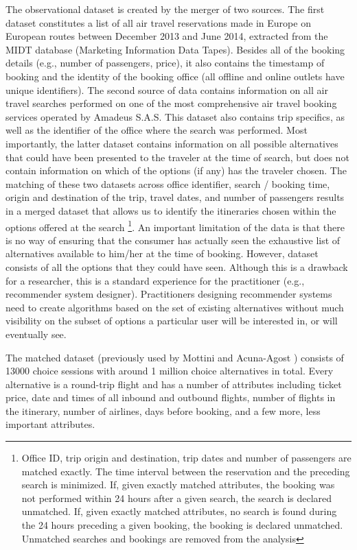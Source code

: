 \documentclass[a4paper,12pt]{article}
\newcommand{\citeyearonly}[1]{\citeyearpar{#1}}
\begin{document}
The observational dataset is created by the merger of two sources. The first dataset constitutes a list of all air travel reservations made in Europe on European routes between December 2013 and June 2014, extracted from the MIDT database (Marketing Information Data Tapes). Besides all of the booking details (e.g., number of passengers, price), it also contains the timestamp of booking and the identity of the booking office (all offline and online outlets have unique identifiers). The second source of data contains information on all air travel searches performed on one of the most comprehensive air travel booking services operated by Amadeus S.A.S. This dataset also contains trip specifics, as well as the identifier of the office where the search was performed. Most importantly, the latter dataset contains information on all possible alternatives that could have been presented to the traveler at the time of search, but does not contain information on which of the options (if any) has the traveler chosen. The matching of these two datasets across office identifier, search / booking time, origin and destination of the trip, travel dates, and number of passengers results in a merged dataset that allows us to identify the itineraries chosen within the options offered at the search \footnote{Office ID, trip origin and destination, trip dates and number of passengers are matched exactly. The time interval between the reservation and the preceding search is minimized. If, given exactly matched attributes, the booking was not performed within 24 hours after a given search, the search is declared unmatched. If, given exactly matched attributes, no search is found during the 24 hours preceding a given booking, the booking is declared unmatched. Unmatched searches and bookings are removed from the analysis}.  An important limitation of the data is that there is no way of ensuring that the consumer has actually seen the exhaustive list of alternatives available to him/her at the time of booking. However, dataset consists of all the options that they could have seen. Although this is a drawback for a researcher, this is a standard experience for the practitioner (e.g., recommender system designer). Practitioners designing recommender systems need to create algorithms based on the set of existing alternatives without much visibility on the subset of options a particular user will be interested in, or will eventually see.

The matched dataset (previously used by Mottini and Acuna-Agost \citeyearonly{mottiniAcunaAgost17}) consists of 13000 choice sessions with around 1 million choice alternatives in total. Every alternative is a round-trip flight and has a number of attributes including ticket price, date and times of all inbound and outbound flights, number of flights in the itinerary, number of airlines, days before booking, and a few more, less important attributes.
\end{document}
